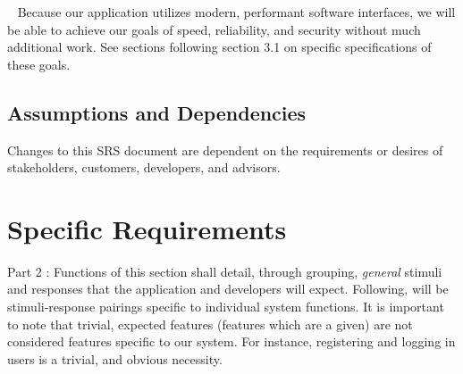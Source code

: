 \documentclass{scrreprt}
\begin{document}
\par ~ Because our application utilizes modern, performant software interfaces, we will be able to achieve our goals of speed, reliability, and security without much additional work. See sections following section 3.1 on specific specifications of these goals.


\section{Assumptions and Dependencies}
Changes to this SRS document are dependent on the requirements or desires of stakeholders, customers, developers, and advisors. 


\chapter{Specific Requirements}
Part 2 : Functions of this section shall detail, through grouping, \emph{general} stimuli and responses that the application and developers will expect. Following, will be stimuli-response pairings specific to individual system functions. It is important to note that trivial, expected features (features which are a given) are not considered features specific to our system. For instance, registering and logging in users is a trivial, and obvious necessity.
\end{document}
